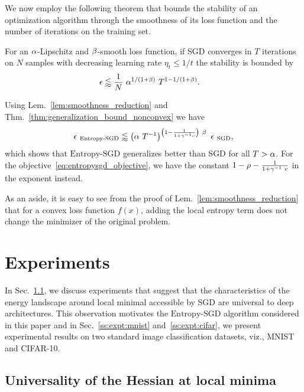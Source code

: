 \documentclass[10pt]{article}
\newcommand{\entropysgd}{\mathrm{Entropy}\textrm{-}\mathrm{SGD}}
\begin{document}
We now employ the following theorem that bounds the stability of an optimization algorithm through the smoothness of its loss function and the number of iterations on the training set.
\begin{theorem}
\label{thm:generalization_bound_nonconvex}
For an $\alpha$-Lipschitz and $\beta$-smooth loss function, if SGD converges in $T$ iterations on $N$ samples with decreasing learning rate $\eta_t \leq 1/t$ the stability is bounded by
\begin{align*}
    \epsilon
    &\lessapprox \frac{1}{N}\ \alpha^{1/(1 + \beta)}\ T^{1 - 1/(1 + \beta)}.
\end{align*}
\end{theorem}
%
Using Lem.~\ref{lem:smoothness_reduction} and Thm.~\ref{thm:generalization_bound_nonconvex} we have
\begin{equation}
    \e_{\ \entropysgd} \lessapprox \rbrac{\a\ T^{-1}}^{\rbrac{1 - \f{1}{1 + \g^{-1}c}}\ \b}\ \e_{\ \textrm{SGD}},
    \label{eq:stability_bound}
\end{equation}
which shows that $\entropysgd$ generalizes better than SGD for all $T > \alpha$. For the objective~\eqref{eq:entropysgd_objective}, we have the constant $1 - \rho - \frac{1}{1 + \gamma^{-1}\ c}$ in the exponent instead.

As an aside, it is easy to see from the proof of Lem.~\ref{lem:smoothness_reduction} that for a convex loss function $f(x)$, adding the local entropy term does not change the minimizer of the original problem.

\section{Experiments}
\label{s:expt}

In Sec.~\ref{ss:expt:universality}, we discuss experiments that suggest that the characteristics of the energy landscape around local minimal accessible by SGD are universal to deep architectures.  This observation motivates the $\entropysgd$ algorithm considered in this paper and in Sec.~\ref{ss:expt:mnist} and~\ref{ss:expt:cifar}, we present experimental results on two standard image classification datasets, viz., MNIST and CIFAR-10.

\subsection{Universality of the Hessian at local minima}
\label{ss:expt:universality}
\end{document}
